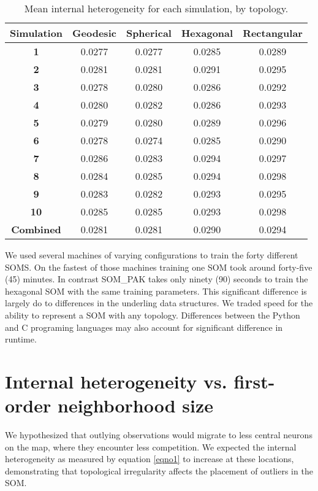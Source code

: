 \begin{table}[hbt]
\centering
\caption{Mean internal heterogeneity for each simulation, by topology.}
\label{ivtable3}
\begin{tabular}{|c||c|c|c|c|}
\hline
\textbf{Simulation} & Geodesic & Spherical & Hexagonal & Rectangular \\
\hline
\hline
\textbf{1} & 0.0277 & 0.0277 & 0.0285 & 0.0289 \\
\textbf{2} & 0.0281 & 0.0281 & 0.0291 & 0.0295 \\
\textbf{3} & 0.0278 & 0.0280 & 0.0286 & 0.0292 \\
\textbf{4} & 0.0280 & 0.0282 & 0.0286 & 0.0293 \\
\textbf{5} & 0.0279 & 0.0280 & 0.0289 & 0.0296 \\
\textbf{6} & 0.0278 & 0.0274 & 0.0285 & 0.0290 \\
\textbf{7} & 0.0286 & 0.0283 & 0.0294 & 0.0297 \\
\textbf{8} & 0.0284 & 0.0285 & 0.0294 & 0.0298 \\
\textbf{9} & 0.0283 & 0.0282 & 0.0293 & 0.0295 \\
\textbf{10}& 0.0285 & 0.0285 & 0.0293 & 0.0298 \\
\hline
\hline
\textbf{Combined} & 0.0281 & 0.0281 & 0.0290 & 0.0294\\
\hline
\end{tabular} \end{table}

We used several machines of varying configurations to train the forty
different SOMS.  On the fastest of those machines training one SOM took
around forty-five (45) minutes.  In contrast SOM\_PAK takes only ninety (90)
seconds to train the hexagonal SOM with the same training parameters.  This
significant difference is largely do to differences in the underling data
structures.  We traded speed for the ability to represent a SOM with any
topology.  Differences between the Python and C programing languages may also
account for significant difference in runtime.


\section{Internal heterogeneity vs. first-order neighborhood size}
\label{rdq1}
We hypothesized that outlying observations would migrate to less central neurons on the map, where
they encounter less competition.  We expected the internal heterogeneity
as measured by equation \ref{eqno1} to increase at these locations,
demonstrating that topological irregularity affects the placement of outliers
in the SOM.  

